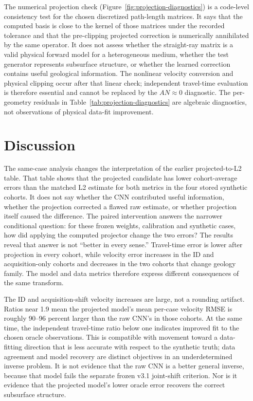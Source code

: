 \documentclass[11pt]{article}
\begin{document}
The numerical projection check (Figure~\ref{fig:projection-diagnostics}) is a code-level consistency test for the chosen discretized path-length matrices. It says that the computed basis is close to the kernel of those matrices under the recorded tolerance and that the pre-clipping projected correction is numerically annihilated by the same operator. It does not assess whether the straight-ray matrix is a valid physical forward model for a heterogeneous medium, whether the test generator represents subsurface structure, or whether the learned correction contains useful geological information. The nonlinear velocity conversion and physical clipping occur after that linear check; independent travel-time evaluation is therefore essential and cannot be replaced by the $AN\approx0$ diagnostic. The per-geometry residuals in Table~\ref{tab:projection-diagnostics} are algebraic diagnostics, not observations of physical data-fit improvement.

\section{Discussion}\label{sec:discussion}
The same-case analysis changes the interpretation of the earlier projected-to-L2 table. That table shows that the projected candidate has lower cohort-average errors than the matched L2 estimate for both metrics in the four stored synthetic cohorts. It does not say whether the CNN contributed useful information, whether the projection corrected a flawed raw estimate, or whether projection itself caused the difference. The paired intervention answers the narrower conditional question: for these frozen weights, calibration and synthetic cases, how did applying the computed projector change the two errors? The results reveal that answer is not “better in every sense.” Travel-time error is lower after projection in every cohort, while velocity error increases in the ID and acquisition-only cohorts and decreases in the two cohorts that change geology family. The model and data metrics therefore express different consequences of the same transform.

The ID and acquisition-shift velocity increases are large, not a rounding artifact. Ratios near 1.9 mean the projected model's mean per-case velocity RMSE is roughly 90--96 percent larger than the raw CNN's in those cohorts. At the same time, the independent travel-time ratio below one indicates improved fit to the chosen oracle observations. This is compatible with movement toward a data-fitting direction that is less accurate with respect to the synthetic truth; data agreement and model recovery are distinct objectives in an underdetermined inverse problem. It is not evidence that the raw CNN is a better general inverse, because that model fails the separate frozen v3.1 joint-shift criterion. Nor is it evidence that the projected model's lower oracle error recovers the correct subsurface structure.
\end{document}
